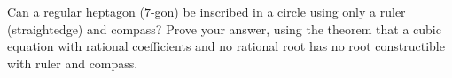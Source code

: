 Can a regular heptagon ($7$-gon) be inscribed in a circle using only a ruler (straightedge) and compass? Prove your answer, using the theorem that a cubic equation with rational coefficients and no rational root has no root constructible with ruler and compass.
